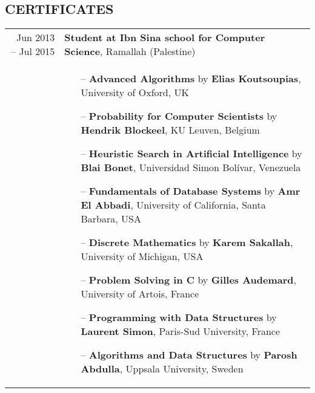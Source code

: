      \subsection*{CERTIFICATES}
  \begin{tabularx}{\linewidth}{r X}
    Jun 2013 -- Jul 2015 & {\bf Student at Ibn Sina school for Computer Science}, Ramallah (Palestine)\\
    & \begin{itemize}[noitemsep,topsep=-4pt]
    \setlength\itemsep{5pt}
      \item[--] \textbf{Advanced Algorithms} by \textbf{Elias Koutsoupias}, University of Oxford, UK
      \item[--] \textbf{Probability for Computer Scientists} by \textbf{Hendrik Blockeel}, KU Leuven, Belgium
      \item[--] \textbf{Heuristic Search in Artificial Intelligence} by \textbf{Blai Bonet}, Universidad Simon Bolívar, Venezuela
      \item[--] \textbf{Fundamentals of Database Systems} by \textbf{Amr El Abbadi}, University of California, Santa Barbara, USA
      \item[--] \textbf{Discrete Mathematics} by \textbf{Karem Sakallah}, University of Michigan, USA
      \item[--] \textbf{Problem Solving in C} by \textbf{Gilles Audemard}, University of Artois, France
      \item[--] \textbf{Programming with Data Structures} by \textbf{Laurent Simon}, Paris-Sud University, France
      \item[--] \textbf{Algorithms and Data Structures} by \textbf{Parosh Abdulla}, Uppsala University, Sweden
    \end{itemize}\\
  \end{tabularx}
  